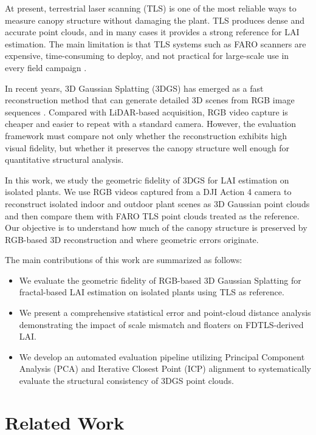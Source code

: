 \documentclass[10pt,twocolumn,letterpaper]{article}
\begin{document}
At present, terrestrial laser scanning (TLS) is one of the most reliable ways to measure canopy structure without damaging the plant. TLS produces dense and accurate point clouds, and in many cases it provides a strong reference for LAI estimation. The main limitation is that TLS systems such as FARO scanners are expensive, time-consuming to deploy, and not practical for large-scale use in every field campaign \cite{windham2019creating}. 

In recent years, 3D Gaussian Splatting (3DGS) has emerged as a fast reconstruction method that can generate detailed 3D scenes from RGB image sequences \cite{wu2024recent}. Compared with LiDAR-based acquisition, RGB video capture is cheaper and easier to repeat with a standard camera. However, the evaluation framework must compare not only whether the reconstruction exhibits high visual fidelity, but whether it preserves the canopy structure well enough for quantitative structural analysis.

In this work, we study the geometric fidelity of 3DGS for LAI estimation on isolated plants. We use RGB videos captured from a DJI Action 4 camera to reconstruct isolated indoor and outdoor plant scenes as 3D Gaussian point clouds and then compare them with FARO TLS point clouds treated as the reference. Our objective is to understand how much of the canopy structure is preserved by RGB-based 3D reconstruction and where geometric errors originate.

The main contributions of this work are summarized as follows:
\begin{itemize}
    \item We evaluate the geometric fidelity of RGB-based 3D Gaussian Splatting for fractal-based LAI estimation on isolated plants using TLS as reference.
    \item We present a comprehensive statistical error and point-cloud distance analysis demonstrating the impact of scale mismatch and floaters on FDTLS-derived LAI.
    \item We develop an automated evaluation pipeline utilizing Principal Component Analysis (PCA) and Iterative Closest Point (ICP) alignment to systematically evaluate the structural consistency of 3DGS point clouds.
\end{itemize}

\section{Related Work}
\end{document}
